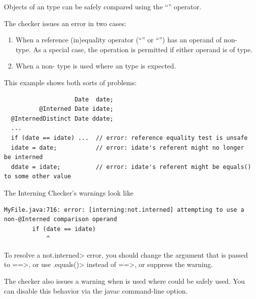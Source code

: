 
Objects of an  type can be safely compared using the ``\code{==}''
operator.

The checker issues an error in two cases:

\begin{enumerate}

\item
  When a reference (in)equality operator (``\code{==}'' or ``\code{!=}'')
  has an operand of non- type.
  As a special case, the operation is permitted if either operand is of
   type.

\item
  When a non- type is used
  where an  type
  is expected.

\end{enumerate}

This example shows both sorts of problems:

\begin{Verbatim}
                    Date  date;
          @Interned Date idate;
  @InternedDistinct Date ddate;
  ...
  if (date == idate) ...  // error: reference equality test is unsafe
  idate = date;           // error: idate's referent might no longer be interned
  ddate = idate;          // error: idate's referent might be equals() to some other value
\end{Verbatim}

\label{lint-dotequals}

The Interning Checker's warnings look like

\begin{Verbatim}
MyFile.java:716: error: [interning:not.interned] attempting to use a non-@Interned comparison operand
        if (date == idate)
            ^
\end{Verbatim}

\noindent
To resolve a \<not.interned> error, you should change the argument that is
passed to \<==>, or use \<.equals()> instead of \<==>, or suppress the
warning.

The checker also issues a warning when  is used where
\code{==} could be safely used.  You can disable this behavior via the
javac  command-line option.

